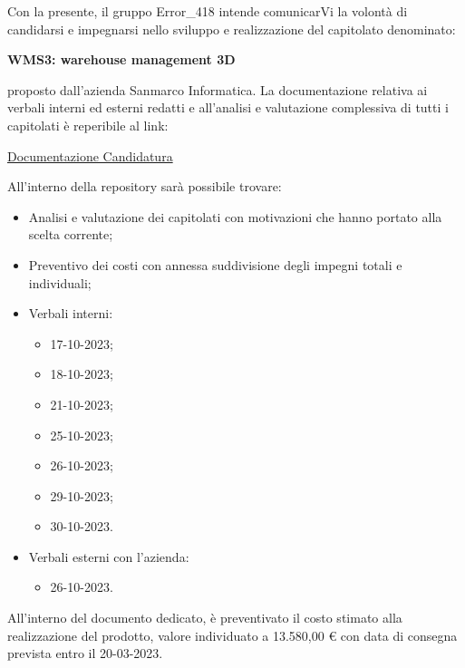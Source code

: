 \documentclass[a4paper, twoside]{article}
\begin{document}
\large

\newpage %



\noindent
Con la presente, il gruppo Error\_418 intende comunicarVi la volontà di candidarsi e impegnarsi nello sviluppo e realizzazione del capitolato denominato:
\begin{center}
\textbf{WMS3: warehouse management 3D}
\end{center}
proposto dall'azienda Sanmarco Informatica. La documentazione relativa ai verbali interni ed esterni redatti e all'analisi e valutazione complessiva di tutti i capitolati è reperibile al link: 
\begin{center}
    \LARGE
\href{https://github.com/Error-418-SWE/Documenti/tree/main}{Documentazione Candidatura}
\end{center}

\vspace{0.5cm}
\noindent
All'interno della repository sarà possibile trovare:
\begin{itemize}
    \item Analisi e valutazione dei capitolati con motivazioni che hanno portato alla scelta corrente;
    \item Preventivo dei costi con annessa suddivisione degli impegni totali e individuali;
    \item Verbali interni:
    \begin{itemize}
        \item 17-10-2023;
        \item 18-10-2023;
        \item 21-10-2023;
        \item 25-10-2023;
        \item 26-10-2023;
        \item 29-10-2023;
        \item 30-10-2023.
    \end{itemize}
    \item Verbali esterni con l'azienda:
    \begin{itemize}
        \item 26-10-2023.
    \end{itemize}
\end{itemize}
All'interno del documento dedicato, è preventivato il costo stimato alla realizzazione del 
prodotto, valore individuato a 13.580,00 € con data di consegna prevista entro il 20-03-2023.
\end{document}
